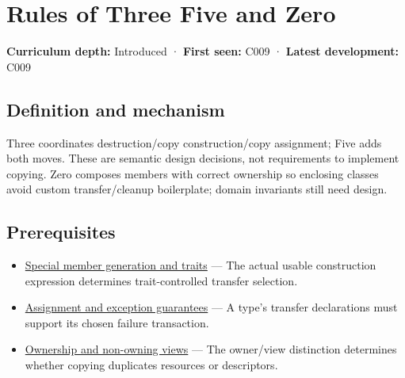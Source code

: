 \hypertarget{appendix-7679107d057e}{}\label{referencestart:appendix-7679107d057e}
\section{Rules of Three Five and Zero}\label{appendix-7679107d057e-rules-of-three-five-and-zero}

\hypertarget{appendix-7679107d057e-rules-of-three-five-and-zero}{}

\textbf{Curriculum depth:} Introduced · \textbf{First seen:} C009 · \textbf{Latest development:} C009

\begin{allmightroledefinition}

\subsection{Definition and mechanism}\label{appendix-7679107d057e-definition-and-mechanism}

\hypertarget{appendix-7679107d057e-definition-and-mechanism}{}

Three coordinates destruction/copy construction/copy assignment; Five adds both moves. These are semantic design decisions, not requirements to implement copying. Zero composes members with correct ownership so enclosing classes avoid custom transfer/cleanup boilerplate; domain invariants still need design.

\end{allmightroledefinition}

\subsection{Prerequisites}\label{appendix-7679107d057e-prerequisites}

\hypertarget{appendix-7679107d057e-prerequisites}{}

\begin{itemize}
\tightlist
\item
  \hyperref[appendix-42e02a12c694]{Special member generation and traits} --- The actual usable construction expression determines trait-controlled transfer selection.
\item
  \hyperref[appendix-bea6beb5350f]{Assignment and exception guarantees} --- A type's transfer declarations must support its chosen failure transaction.
\item
  \hyperref[appendix-d52e4486f527]{Ownership and non-owning views} --- The owner/view distinction determines whether copying duplicates resources or descriptors.
\end{itemize}

